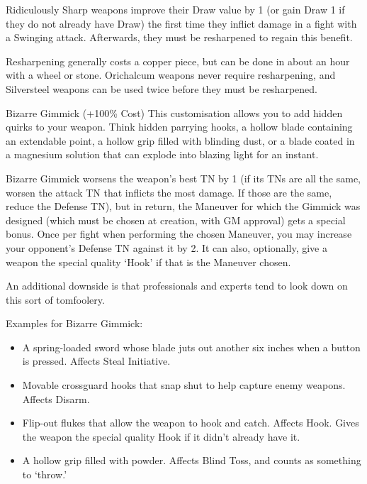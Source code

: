 \documentclass[oneside,11pt,english]{book}
\begin{document}
 

Ridiculously Sharp weapons improve their Draw value by 1 (or gain Draw 1 if they do not already have 
Draw) the first time they inflict damage in a fight with a Swinging attack. Afterwards, they must be 
resharpened to regain this benefit. 

 

Resharpening generally costs a copper piece, but can be done in about an hour with a wheel or stone. 
Orichalcum weapons never require resharpening, and Silversteel weapons can be used twice before they 
must be resharpened. 

 


Bizarre Gimmick (+100\% Cost) 
This customisation allows you to add hidden quirks to your weapon. Think hidden parrying hooks, a 
hollow blade containing an extendable point, a hollow grip filled with blinding dust, or a blade coated in a 
magnesium solution that can explode into blazing light for an instant. 

 

Bizarre Gimmick worsens the weapon’s best TN by 1 (if its TNs are all the same, worsen the attack TN 
that inflicts the most damage. If those are the same, reduce the Defense TN), but in return, the Maneuver 
for which the Gimmick was designed (which must be chosen at creation, with GM approval) gets a 
special bonus. Once per fight when performing the chosen Maneuver, you may increase your opponent’s 
Defense TN against it by 2. It can also, optionally, give a weapon the special quality ‘Hook’ if that is the 
Maneuver chosen. 

 

An additional downside is that professionals and experts tend to look down on this sort of tomfoolery. 

 

Examples for Bizarre Gimmick:
\begin{itemize} 
\item A spring-loaded sword whose blade juts out another six inches when a button is pressed. Affects 
Steal Initiative. 
\item Movable crossguard hooks that snap shut to help capture enemy weapons. Affects Disarm. 
\item Flip-out flukes that allow the weapon to hook and catch. Affects Hook. Gives the weapon the 
special quality Hook if it didn’t already have it. 
\item A hollow grip filled with powder. Affects Blind Toss, and counts as something to ‘throw.’ 
\end{itemize}
 
\end{document}

